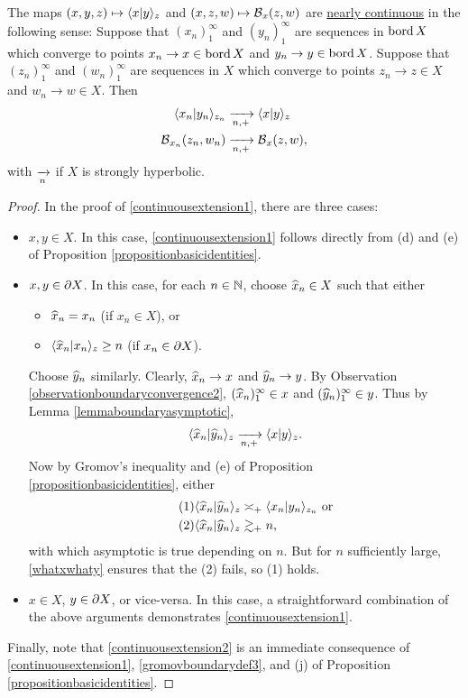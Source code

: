 \begin{lemma}
\label{lemmanearcontinuity}
The maps $(x,y,z)\mapsto \langle x|y\rangle_z$ and $(x,z,w)\mapsto \operatorname{\mathcal B}_x(z,w)$ are \underline{nearly continuous} in the following sense: Suppose that $(x_n)_1^\infty$ and $(y_n)_1^\infty$ are sequences in $\operatorname{bord} X$ which converge to points $x_n\to x\in\operatorname{bord} X$ and $y_n\to y\in\operatorname{bord} X$. Suppose that $(z_n)_1^\infty$ and $(w_n)_1^\infty$ are sequences in $X$ which converge to points $z_n\to z\in X$ and $w_n\to w\in X$. Then
\begin{align} \label{continuousextension1}
\langle x_n|y_n\rangle_{z_n} &\xrightarrow[n,+]{} \langle x|y\rangle_z\\ \label{continuousextension2}
\operatorname{\mathcal B}_{x_n}(z_n,w_n) &\xrightarrow[n,+]{} \operatorname{\mathcal B}_x(z,w),
\end{align}
with $\xrightarrow[n]{}$ if $X$ is strongly hyperbolic.
\end{lemma}
\begin{proof}
In the proof of \eqref{continuousextension1}, there are three cases:
\begin{itemize}
\item[Case 1:] $x,y\in X$. In this case, \eqref{continuousextension1} follows directly from (d) and (e) of Proposition \ref{propositionbasicidentities}.
\item[Case 2:] $x,y\in\partial X$. In this case, for each $n\in\Namer$, choose $\widehat x_n\in X$ such that either
\begin{itemize}
\item[(1)] $\widehat x_n = x_n$ (if $x_n\in X$), or
\item[(2)] $\langle \widehat x_n|x_n\rangle_z\geq n$ (if $x_n\in\partial X$).
\end{itemize}
Choose $\widehat y_n$ similarly. Clearly, $\widehat x_n\to x$ and $\widehat y_n \to y$. By Observation \ref{observationboundaryconvergence2}, $(\widehat x_n)_1^\infty\in x$ and $(\widehat y_n)_1^\infty\in y$. Thus by Lemma \ref{lemmaboundaryasymptotic},
\begin{equation}
\label{whatxwhaty}
\langle \widehat x_n|\widehat y_n\rangle_z \xrightarrow[n,+]{} \langle x|y\rangle_z.
\end{equation}
Now by Gromov's inequality and (e) of Proposition \ref{propositionbasicidentities}, either
\begin{align*} \tag{1}
\langle \widehat x_n|\widehat y_n\rangle_z &\asymp_+ \langle x_n|y_n\rangle_{z_n} \textup{ or }\\ \tag{2}
\langle \widehat x_n|\widehat y_n\rangle_z &\gtrsim_+ n,
\end{align*}
with which asymptotic is true depending on $n$. But for $n$ sufficiently large, \eqref{whatxwhaty} ensures that the (2) fails, so (1) holds.
\item[Case 3:] $x\in X$, $y\in\partial X$, or vice-versa. In this case, a straightforward combination of the above arguments demonstrates \eqref{continuousextension1}.
\end{itemize}
Finally, note that \eqref{continuousextension2} is an immediate consequence of \eqref{continuousextension1}, \eqref{gromovboundarydef3}, and (j) of Proposition \ref{propositionbasicidentities}.
\end{proof}

